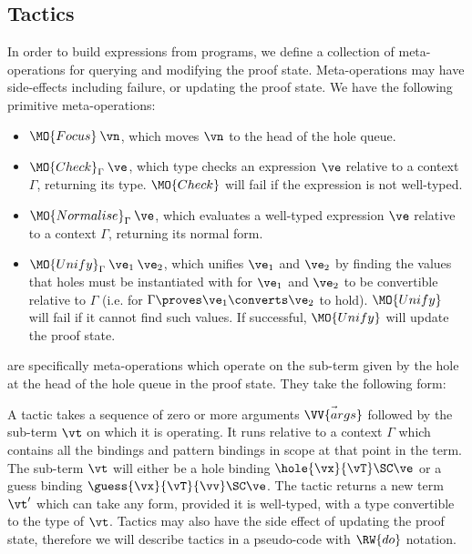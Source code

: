 \newcommand{\Check}{\MO{Check}_\Gamma}
\newcommand{\Eval}{\MO{Normalise}_\Gamma}
\newcommand{\Unify}{\MO{Unify}_\Gamma}

\subsection{Tactics}

In order to build \TT{} expressions from \Idris{} programs, we define a collection
of meta-operations for querying and modifying the proof state. Meta-operations
may have side-effects including failure, or updating the proof state. We have the following
primitive meta-operations:

\begin{itemize}
\item $\MO{Focus}\:\vn$, which moves $\vn$ to the head of the hole queue.
\item $\Check\:\ve$, which type checks an expression $\ve$ relative to a context
$\Gamma$, returning its type.
$\MO{Check}$ will fail
if the expression is not well-typed.
\item $\Eval\:\ve$, which evaluates a well-typed expression $\ve$ relative to a context 
$\Gamma$, returning its normal form.
\item 
$\Unify\:\ve_1\:\ve_2$, 
which unifies $\ve_1$ and $\ve_2$ by finding the values that holes must be instantiated
with for $\ve_1$ and $\ve_2$ to be convertible relative to $\Gamma$
(i.e. for $\Gamma\proves\ve_1\converts\ve_2$ to hold). $\MO{Unify}$ will fail
if it cannot find such values. If successful, $\MO{Unify}$ will update the proof state.
\end{itemize}

 are specifically meta-operations which operate on the sub-term given
by the hole at the head of the hole queue in the proof state. They take the following form:


A tactic takes a sequence of zero or more arguments $\vec{\VV{args}}$ followed
by the sub-term $\vt$ on which it is operating. It runs relative to a context
$\Gamma$ which contains all the bindings and pattern bindings in scope at that
point in the term. The sub-term $\vt$ will either be a hole binding
$\hole{\vx}{\vT}\SC\ve$ or a guess binding $\guess{\vx}{\vT}{\vv}\SC\ve$. The
tactic returns a new term $\vt'$ which can take any form, provided it is
well-typed, with a type convertible to the type of $\vt$. 
Tactics may also have the side effect of updating the proof state,
therefore we will describe tactics in a pseudo-code with $\RW{do}$ notation.

